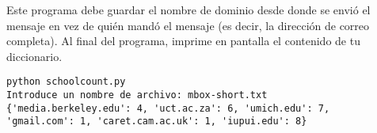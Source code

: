 \begin{ex}
Este programa debe guardar el nombre de dominio
desde donde se envió el mensaje en vez de quién mandó el mensaje
(es decir, la dirección de correo completa). Al final
del programa, imprime en pantalla el contenido de tu diccionario.

\beforeverb
\begin{verbatim}
python schoolcount.py
Introduce un nombre de archivo: mbox-short.txt
{'media.berkeley.edu': 4, 'uct.ac.za': 6, 'umich.edu': 7, 
'gmail.com': 1, 'caret.cam.ac.uk': 1, 'iupui.edu': 8}
\end{verbatim}
\afterverb
\end{ex}

